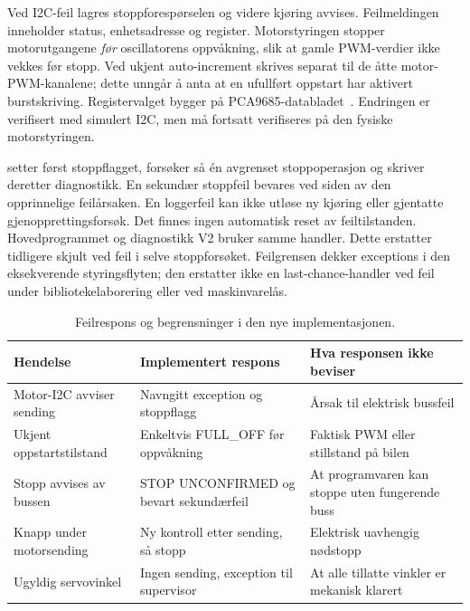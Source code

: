 Ved I2C-feil lagres stoppforespørselen og videre kjøring avvises.
Feilmeldingen inneholder status, enhetsadresse og register. Motorstyringen
stopper motorutgangene \emph{før} oscillatorens oppvåkning, slik at gamle
PWM-verdier ikke vekkes før stopp. Ved ukjent auto-increment skrives
 separat til de åtte motor-PWM-kanalene; dette unngår å anta
at en ufullført oppstart har aktivert burstskriving. Registervalget bygger
på PCA9685-databladet~\cite{pca9685_2026}. Endringen er verifisert med
simulert I2C, men må fortsatt verifiseres på den fysiske motorstyringen.

 setter først stoppflagget, forsøker så én
avgrenset stoppoperasjon og skriver deretter diagnostikk. En sekundær
stoppfeil bevares ved siden av den opprinnelige feilårsaken. En loggerfeil
kan ikke utløse ny kjøring eller gjentatte gjenopprettingsforsøk. Det finnes
ingen automatisk reset av feiltilstanden. Hovedprogrammet og diagnostikk V2
bruker samme handler. Dette erstatter tidligere skjult 
ved feil i selve stoppforsøket. Feilgrensen dekker exceptions i den
eksekverende styringsflyten; den erstatter ikke en last-chance-handler ved
feil under bibliotekelaborering eller ved maskinvarelås.

\begin{table}[htbp]
\centering\small
\caption{Feilrespons og begrensninger i den nye implementasjonen.}
\begin{tabularx}{\textwidth}{@{}P{34mm}YY@{}}\toprule
Hendelse & Implementert respons & Hva responsen ikke beviser\\\midrule
Motor-I2C avviser sending & Navngitt exception og stoppflagg & Årsak til elektrisk bussfeil\\
Ukjent oppstartstilstand & Enkeltvis FULL\_OFF før oppvåkning & Faktisk PWM eller stillstand på bilen\\
Stopp avvises av bussen & STOP UNCONFIRMED og bevart sekundærfeil & At programvaren kan stoppe uten fungerende buss\\
Knapp under motorsending & Ny kontroll etter sending, så stopp & Elektrisk uavhengig nødstopp\\
Ugyldig servovinkel & Ingen sending, exception til supervisor & At alle tillatte vinkler er mekanisk klarert\\
\bottomrule\end{tabularx}
\end{table}

